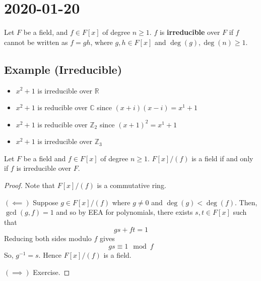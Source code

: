 \section{2020-01-20}
\begin{defbox}
    \begin{definition}
    Let $ F $ be a field, and $ f\in F[x] $ of degree $ n\geqslant 1 $.
    $ f $ is \textbf{irreducible} over $ F $ if $ f $ cannot be written
    as $ f=gh $, where $ g,h\in F[x] $ and $ \deg(g),\deg(n)\geqslant 1 $.
\end{definition} \end{defbox}

\begin{exbox}
    \subsection{Example (Irreducible)}
    \begin{itemize}
        \item $ x^2+1 $ is irreducible over $ \mathbb{R} $
        \item $ x^2+1 $ is reducible over $ \mathbb{C} $ since $ (x+i)(x-i)=x^1+1 $
        \item $ x^2+1 $ is reducible over $ \mathbb{Z}_2 $ since $ (x+1)^2=x^1+1 $
        \item $ x^2+1 $ is irreducible over $ \mathbb{Z}_3 $
    \end{itemize}
\end{exbox}

\begin{thmbox}
    \begin{theorem}
    Let $ F $ be a field and $ f\in F[x] $ of degree $ n\geqslant 1 $.
    $ F[x]/(f) $ is a field if and only if $ f $ is irreducible over $ F $.
\end{theorem} \end{thmbox}

\begin{proof}
    Note that $ F[x]/(f) $ is a commutative ring.
    
    $ (\impliedby) $ Suppose $ g\in F[x]/(f) $ where $ g\neq 0 $
    and $ \deg(g)<\deg(f) $. Then, $ \gcd(g,f)=1 $ and so by EEA
    for polynomials, there exists $ s,t\in F[x] $ such that
    \[ gs+ft=1 \]
    Reducing both sides modulo $ f $ gives
    \[ gs\equiv 1 \mod f \]
    So, $ g^{-1}=s $. Hence $ F[x]/(f) $ is a field.
    
    $ (\implies) $ Exercise.
\end{proof}

